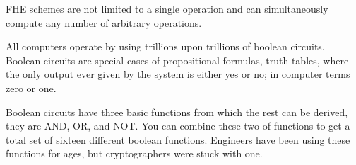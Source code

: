 FHE schemes are not limited to a single operation and can simultaneously compute any number of arbitrary operations. 

All computers operate by using trillions upon trillions of boolean circuits. Boolean circuits are special cases of propositional formulas, truth tables, where the only output ever given by the system is either yes or no; in computer terms zero or one. 

Boolean circuits have three basic functions from which the rest can be derived, they are AND, OR, and NOT. You can combine these two of functions to get a total set of sixteen different boolean functions. Engineers have been using these functions for ages, but cryptographers were stuck with one. 



